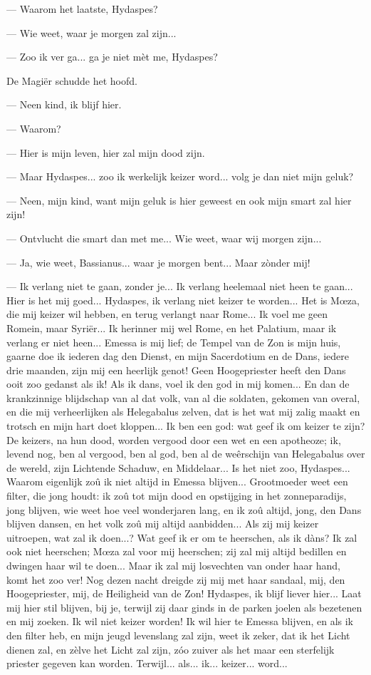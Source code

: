 \documentclass[a4paper, 12pt, oneside, dutch]{article}
\begin{document}
--- Waarom het laatste, Hydaspes?

--- Wie weet, waar je morgen zal zijn...

--- Zoo ik ver ga... ga je niet mèt me, Hydaspes?

De Magiër schudde het hoofd.

--- Neen kind, ik blijf hier.

--- Waarom?

--- Hier is mijn leven, hier zal mijn dood zijn.

--- Maar Hydaspes... zoo ik werkelijk keizer word... volg je dan niet mijn geluk?

--- Neen, mijn kind, want mijn geluk is hier geweest en ook mijn smart zal hier zijn!

--- Ontvlucht die smart dan met me... Wie weet, waar wij morgen zijn...

--- Ja, wie weet, Bassianus... waar je morgen bent... Maar zònder mij!

--- Ik verlang niet te gaan, zonder je... Ik verlang heelemaal niet heen te gaan... Hier is het mij goed... Hydaspes, ik verlang niet keizer te worden... Het is Mœza, die mij keizer wil hebben, en terug verlangt naar Rome... Ik voel me geen Romein, maar Syriër... Ik herinner mij wel Rome, en het Palatium, maar ik verlang er niet heen... Emessa is mij lief; de Tempel van de Zon is mijn huis, gaarne doe ik iederen dag den Dienst, en mijn Sacerdotium en de Dans, iedere drie maanden, zijn mij een heerlijk genot! Geen Hoogepriester heeft den Dans ooit zoo gedanst als ik! Als ik dans, voel ik den god in mij komen... En dan de krankzinnige blijdschap van al dat volk, van al die soldaten, gekomen van overal, en die mij verheerlijken als Helegabalus zelven, dat is het wat mij zalig maakt en trotsch en mijn hart doet kloppen... Ik ben een god: wat geef ik om keizer te zijn? De keizers, na hun dood, worden vergood door een wet en een apotheoze; ik, levend nog, ben al vergood, ben al god, ben al de weêrschijn van Helegabalus over de wereld, zijn Lichtende Schaduw, en Middelaar... Is het niet zoo, Hydaspes... Waarom eigenlijk zoû ik niet altijd in Emessa blijven... Grootmoeder weet een filter, die jong houdt: ik zoû tot mijn dood en opstijging in het zonneparadijs, jong blijven, wie weet hoe veel wonderjaren lang, en ik zoû altijd, jong, den Dans blijven dansen, en het volk zoû mij altijd aanbidden... Als zij mij keizer uitroepen, wat zal ik doen...? Wat geef ik er om te heerschen, als ik dàns? Ik zal ook niet heerschen; Mœza zal voor mij heerschen; zij zal mij altijd bedillen en dwingen haar wil te doen... Maar ik zal mij losvechten van onder haar hand, komt het zoo ver! Nog dezen nacht dreigde zij mij met haar sandaal, mij, den Hoogepriester, mij, de Heiligheid van de Zon! Hydaspes, ik blijf liever hier... Laat mij hier stil blijven, bij je, terwijl zij daar ginds in de parken joelen als bezetenen en mij zoeken. Ik wil niet keizer worden! Ik wil hier te Emessa blijven, en als ik den filter heb, en mijn jeugd levenslang zal zijn, weet ik zeker, dat ik het Licht dienen zal, en zèlve het Licht zal zijn, zóo zuiver als het maar een sterfelijk priester gegeven kan worden. Terwijl... als... ik... keizer... word...
\end{document}
